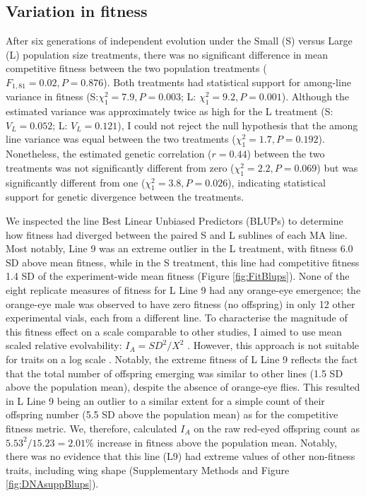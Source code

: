 \subsection{Variation in fitness}
After six generations of independent evolution under the Small (S) versus Large (L) population size treatments, there was no significant difference in mean competitive fitness between the two population treatments ($F_{1,81} =0.02, P = 0.876$). Both treatments had statistical support for among-line variance in fitness (S:$\chi_1^{2} = 7.9, P = 0.003$; L: $\chi_1^{2} = 9.2, P = 0.001$). Although the estimated variance was approximately twice as high for the L treatment (S: $V_L = 0.052$; L: $V_L = 0.121$), I could not reject the null hypothesis that the among line variance was equal between the two treatments ($\chi_1^{2} =1.7, P = 0.192$). Nonetheless, the estimated genetic correlation ($r = 0.44$) between the two treatments was not significantly different from zero ($\chi_1^{2}= 2.2, P =0.069$) but was significantly different from one ($\chi_1^{2} = 3.8, P =0.026$), indicating statistical support for genetic divergence between the treatments. \par

We inspected the line Best Linear Unbiased Predictors (BLUPs) to determine how fitness had diverged between the paired S and L sublines of each MA line. Most notably, Line 9 was an extreme outlier in the L treatment, with fitness 6.0 SD above mean fitness, while in the S treatment, this line had competitive fitness 1.4 SD of the experiment-wide mean fitness (Figure \ref{fig:FitBlups}). None of the eight replicate measures of fitness for L Line 9 had any orange-eye emergence; the orange-eye male was observed to have zero fitness (no offspring) in only 12 other experimental vials, each from a different line. To characterise the magnitude of this fitness effect on a scale comparable to other studies, I aimed to use mean scaled relative evolvability: $I_A = SD^2/X^2$ \citep{Houl92a, Hans11}. However, this approach is not suitable for traits on a log scale \citep{Hans11}. Notably, the extreme fitness of L Line 9 reflects the fact that the total number of offspring emerging was similar to other lines (1.5 SD above the population mean), despite the absence of orange-eye flies. This resulted in L Line 9 being an outlier to a similar extent for a simple count of their offspring number (5.5 SD above the population mean) as for the competitive fitness metric. We, therefore, calculated $I_A$ on the raw red-eyed offspring count as $5.53^2/15.23 = 2.01\%$ increase in fitness above the population mean. Notably, there was no evidence that this line (L9) had extreme values of other non-fitness traits, including wing shape (Supplementary Methods and Figure \ref{fig:DNAsuppBlups}). \par

